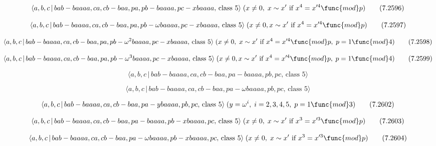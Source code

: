 \documentclass[10pt]{article}
\begin{document}
\begin{equation}
\langle a,b,c\,|\,bab-baaaa,ca,cb-baa,pa,pb-baaaa,pc-xbaaaa,\,\text{class }%
5\rangle \;(x\neq 0,\;x\sim x^{\prime }\text{ if }x^{4}=x^{\prime 4}\func{mod%
}p)  \tag{7.2596}
\end{equation}

\begin{equation}
\langle a,b,c\,|\,bab-baaaa,ca,cb-baa,pa,pb-\omega baaaa,pc-xbaaaa,\,\text{%
class }5\rangle \;(x\neq 0,x\sim x^{\prime}\text{ if }x^4=x^{\prime 4}\func{%
mod}p)  \tag{7.2597}
\end{equation}

\begin{equation}
\langle a,b,c\,|\,bab-baaaa,ca,cb-baa,pa,pb-\omega ^{2}baaaa,pc-xbaaaa,\,%
\text{class }5\rangle \;(x\neq 0,\;x\sim x^{\prime }\text{ if }%
x^{4}=x^{\prime 4}\func{mod}p,\;p=1\func{mod}4)  \tag{7.2598}
\end{equation}

\begin{equation}
\langle a,b,c\,|\,bab-baaaa,ca,cb-baa,pa,pb-\omega ^{3}baaaa,pc-xbaaaa,\,%
\text{class }5\rangle \;(x\neq 0,x\sim x^{\prime}\text{ if }x^4=x^{\prime 4}%
\func{mod}p,\;p=1\func{mod}4)  \tag{7.2599}
\end{equation}

\begin{equation}
\langle a,b,c\,|\,bab-baaaa,ca,cb-baa,pa-baaaa,pb,pc,\,\text{class }5\rangle
\tag{7.2600}
\end{equation}

\begin{equation}
\langle a,b,c\,|\,bab-baaaa,ca,cb-baa,pa-\omega baaaa,pb,pc,\,\text{class }%
5\rangle  \tag{7.2601}
\end{equation}

\begin{equation}
\langle a,b,c\,|\,bab-baaaa,ca,cb-baa,pa-ybaaaa,pb,pc,\,\text{class }%
5\rangle \;(y=\omega ^{i},\;i=2,3,4,5,\;p=1\func{mod}3)  \tag{7.2602}
\end{equation}

\begin{equation}
\langle a,b,c\,|\,bab-baaaa,ca,cb-baa,pa-baaaa,pb-xbaaaa,pc,\,\text{class }%
5\rangle \;(x\neq 0,\;x\sim x^{\prime }\text{ if }x^{3}=x^{\prime 3}\func{mod%
}p)  \tag{7.2603}
\end{equation}

\begin{equation}
\langle a,b,c\,|\,bab-baaaa,ca,cb-baa,pa-\omega baaaa,pb-xbaaaa,pc,\,\text{%
class }5\rangle \;(x\neq 0,\;x\sim x^{\prime }\text{ if }x^{3}=x^{\prime 3}%
\func{mod}p)  \tag{7.2604}
\end{equation}
\end{document}
